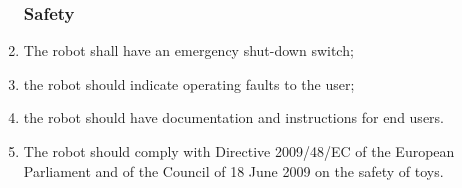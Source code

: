 \begin{enumerate}
            \subsubsection{Safety}
            \item The robot shall have an emergency shut-down switch; \label{spec: kill switch}
            \item the robot should indicate operating faults to the user; \label{spec: error indicator}
            \item the robot should have documentation and instructions for end users. \label{spec: documentation}
            \item The robot should comply with Directive 2009/48/EC of the European Parliament and of the Council of 18 June 2009 on the safety of toys.\cite{EuropeanParliament2009} \label{spec: EU regulations}
        \end{enumerate}
